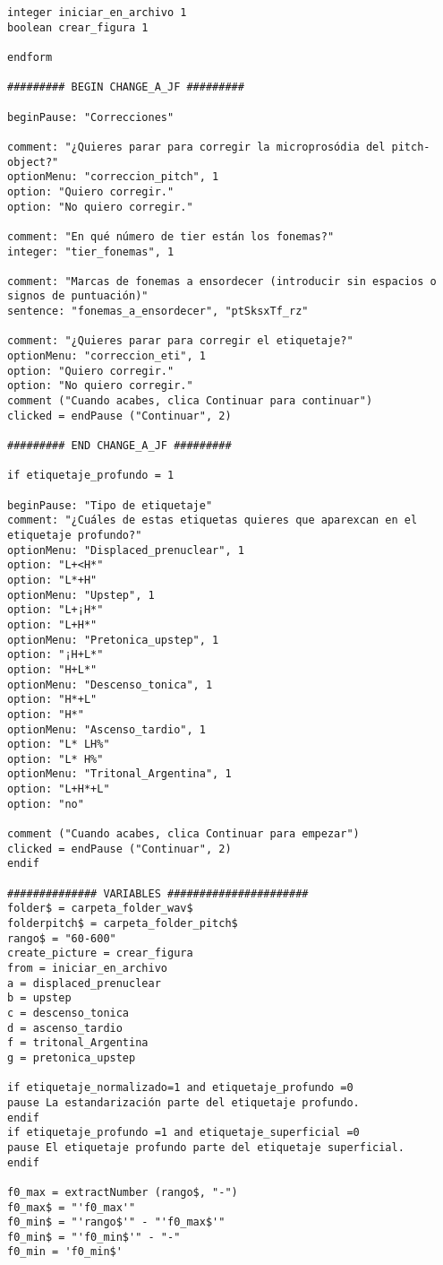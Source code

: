 \begin{lstlisting}
integer iniciar_en_archivo 1
boolean crear_figura 1

endform

######### BEGIN CHANGE_A_JF ######### 

beginPause: "Correcciones"

comment: "¿Quieres parar para corregir la microprosódia del pitch-object?"
optionMenu: "correccion_pitch", 1
option: "Quiero corregir."
option: "No quiero corregir."

comment: "En qué número de tier están los fonemas?"
integer: "tier_fonemas", 1

comment: "Marcas de fonemas a ensordecer (introducir sin espacios o signos de puntuación)"
sentence: "fonemas_a_ensordecer", "ptSksxTf_rz"

comment: "¿Quieres parar para corregir el etiquetaje?"
optionMenu: "correccion_eti", 1
option: "Quiero corregir."
option: "No quiero corregir."
comment ("Cuando acabes, clica Continuar para continuar")
clicked = endPause ("Continuar", 2)

######### END CHANGE_A_JF #########

if etiquetaje_profundo = 1

beginPause: "Tipo de etiquetaje"
comment: "¿Cuáles de estas etiquetas quieres que aparexcan en el etiquetaje profundo?"
optionMenu: "Displaced_prenuclear", 1
option: "L+<H*"
option: "L*+H"
optionMenu: "Upstep", 1
option: "L+¡H*"
option: "L+H*"
optionMenu: "Pretonica_upstep", 1
option: "¡H+L*"
option: "H+L*"
optionMenu: "Descenso_tonica", 1
option: "H*+L"
option: "H*"
optionMenu: "Ascenso_tardio", 1
option: "L* LH%"
option: "L* H%"
optionMenu: "Tritonal_Argentina", 1
option: "L+H*+L"
option: "no"

comment ("Cuando acabes, clica Continuar para empezar")
clicked = endPause ("Continuar", 2)
endif

############## VARIABLES ######################
folder$ = carpeta_folder_wav$
folderpitch$ = carpeta_folder_pitch$
rango$ = "60-600"
create_picture = crear_figura
from = iniciar_en_archivo
a = displaced_prenuclear
b = upstep
c = descenso_tonica
d = ascenso_tardio
f = tritonal_Argentina
g = pretonica_upstep

if etiquetaje_normalizado=1 and etiquetaje_profundo =0
pause La estandarización parte del etiquetaje profundo.
endif
if etiquetaje_profundo =1 and etiquetaje_superficial =0
pause El etiquetaje profundo parte del etiquetaje superficial.
endif

f0_max = extractNumber (rango$, "-")
f0_max$ = "'f0_max'"
f0_min$ = "'rango$'" - "'f0_max$'"
f0_min$ = "'f0_min$'" - "-"
f0_min = 'f0_min$'


\end{lstlisting}
